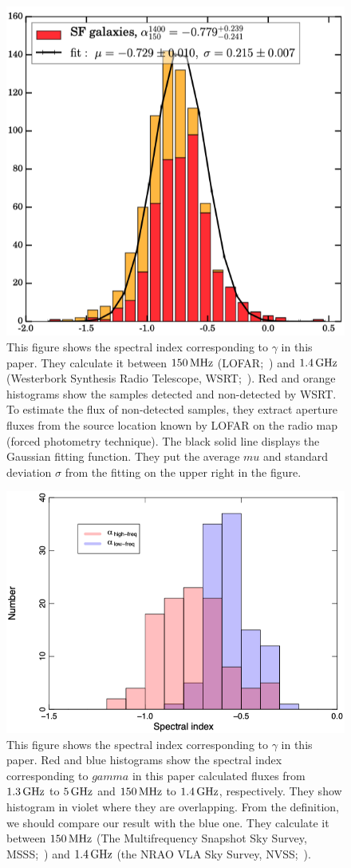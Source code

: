 \begin{figure}[htbp]
	\centering
	\includegraphics[width=.7\linewidth]{Chapter_6/Figures/CalistroRivera2017_Figure7.png}
    \caption[Adapted from \citet{CalistroRivera2017a}]{\label{fig:CalistroRivera2017_figure7}
        This figure shows the spectral index corresponding to $\gamma$ in this paper.
        They calculate it between $150\,\mathrm{MHz}$ (LOFAR;~\citealt{Williams2016}) and $1.4\,\mathrm{GHz}$ (Westerbork Synthesis Radio Telescope, WSRT;~\citealt{DeVries2002}).
        Red and orange histograms show the samples detected and non-detected by WSRT\@.
        To estimate the flux of non-detected samples, they extract aperture fluxes from the source location known by LOFAR on the radio map (forced photometry technique).
        The black solid line displays the Gaussian fitting function.
        They put the average $mu$ and standard deviation $\sigma$ from the fitting on the upper right in the figure.
    }
\end{figure}

\begin{figure}[htbp]
	\centering
	\includegraphics[width=.6\linewidth]{Chapter_6/Figures/Chyzy2018_Figure4.png}
    \caption[Adapted from \citet{Chyzy2018}]{\label{fig:Chyzy2018_figure4}
        This figure shows the spectral index corresponding to $\gamma$ in this paper.
        Red and blue histograms show the spectral index corresponding to $gamma$ in this paper calculated fluxes from $1.3\,\mathrm{GHz}$ to $5\,\mathrm{GHz}$ and $150\,\mathrm{MHz}$ to $1.4\,\mathrm{GHz}$, respectively.
        They show histogram in violet where they are overlapping.
        From the definition, we should compare our result with the blue one.
        They calculate it between $150\,\mathrm{MHz}$ (The Multifrequency Snapshot Sky Survey, MSSS;~\citealt{Heald2015}) and $1.4\,\mathrm{GHz}$ (the NRAO VLA Sky Survey, NVSS;~\citealt{Condon1998}).
    }
\end{figure}

